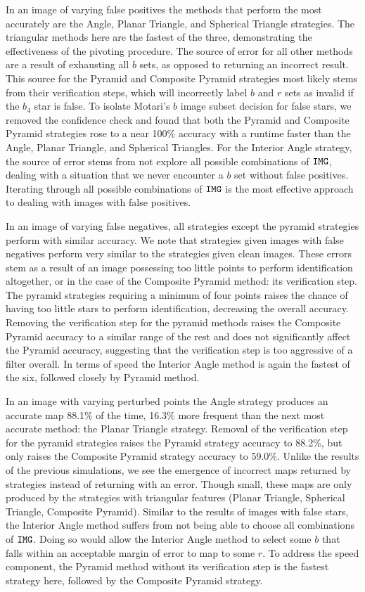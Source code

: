In an image of varying false positives the methods that perform the most accurately are the Angle, Planar Triangle, and Spherical Triangle strategies.
The triangular methods here are the fastest of the three, demonstrating the effectiveness of the pivoting procedure.
The source of error for all other methods are a result of exhausting all $b$ sets, as opposed to returning an incorrect result.
This source for the Pyramid and Composite Pyramid strategies most likely stems from their verification steps, which will incorrectly label $b$ and $r$ sets as invalid if the $b_4$ star is false.
To isolate Motari's $b$ image subset decision for false stars, we removed the confidence check and found that both the Pyramid and Composite Pyramid strategies rose to a near 100\% accuracy with a runtime faster than the Angle, Planar Triangle, and Spherical Triangles.
For the Interior Angle strategy, the source of error stems from not explore all possible combinations of $\texttt{IMG}$, dealing with a situation that we never encounter a $b$ set without false positives.
Iterating through all possible combinations of $\texttt{IMG}$ is the most effective approach to dealing with images with false positives.

In an image of varying false negatives, all strategies except the pyramid strategies perform with similar accuracy.
We note that strategies given images with false negatives perform very similar to the strategies given clean images.
These errors stem as a result of an image possessing too little points to perform identification altogether, or in the case of the Composite Pyramid method: its verification step.
The pyramid strategies requiring a minimum of four points raises the chance of having too little stars to perform identification, decreasing the overall accuracy.
Removing the verification step for the pyramid methods raises the Composite Pyramid accuracy to a similar range of the rest and does not significantly affect the Pyramid accuracy, suggesting that the verification step is too aggressive of a filter overall.
In terms of speed the Interior Angle method is again the fastest of the six, followed closely by Pyramid method.

In an image with varying perturbed points the Angle strategy produces an accurate map 88.1\% of the time, 16.3\% more frequent than the next most accurate method: the Planar Triangle strategy.
Removal of the verification step for the pyramid strategies raises the Pyramid strategy accuracy to 88.2\%, but only raises the Composite Pyramid strategy accuracy to 59.0\%.
Unlike the results of the previous simulations, we see the emergence of incorrect maps returned by strategies instead of returning with an error.
Though small, these maps are only produced by the strategies with triangular features (Planar Triangle, Spherical Triangle, Composite Pyramid).
Similar to the results of images with false stars, the Interior Angle method suffers from not being able to choose all combinations of $\texttt{IMG}$.
Doing so would allow the Interior Angle method to select some $b$ that falls within an acceptable margin of error to map to some $r$.
To address the speed component, the Pyramid method without its verification step is the fastest strategy here, followed by the Composite Pyramid strategy.

